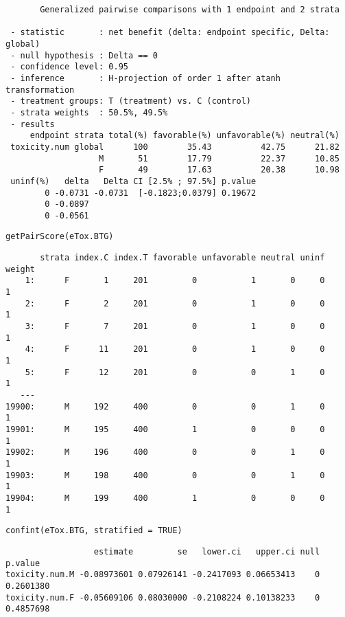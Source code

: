 \documentclass[12pt]{article}
\begin{document}
\begin{verbatim}
       Generalized pairwise comparisons with 1 endpoint and 2 strata

 - statistic       : net benefit (delta: endpoint specific, Delta: global) 
 - null hypothesis : Delta == 0 
 - confidence level: 0.95 
 - inference       : H-projection of order 1 after atanh transformation 
 - treatment groups: T (treatment) vs. C (control) 
 - strata weights  : 50.5%, 49.5% 
 - results
     endpoint strata total(%) favorable(%) unfavorable(%) neutral(%)
 toxicity.num global      100        35.43          42.75      21.82
                   M       51        17.79          22.37      10.85
                   F       49        17.63          20.38      10.98
 uninf(%)   delta   Delta CI [2.5% ; 97.5%] p.value 
        0 -0.0731 -0.0731  [-0.1823;0.0379] 0.19672 
        0 -0.0897                                   
        0 -0.0561
\end{verbatim}

\lstset{language=r,label= ,caption= ,captionpos=b,numbers=none}
\begin{lstlisting}
getPairScore(eTox.BTG)
\end{lstlisting}

\begin{verbatim}
       strata index.C index.T favorable unfavorable neutral uninf weight
    1:      F       1     201         0           1       0     0      1
    2:      F       2     201         0           1       0     0      1
    3:      F       7     201         0           1       0     0      1
    4:      F      11     201         0           1       0     0      1
    5:      F      12     201         0           0       1     0      1
   ---                                                                  
19900:      M     192     400         0           0       1     0      1
19901:      M     195     400         1           0       0     0      1
19902:      M     196     400         0           0       1     0      1
19903:      M     198     400         0           0       1     0      1
19904:      M     199     400         1           0       0     0      1
\end{verbatim}


\lstset{language=r,label= ,caption= ,captionpos=b,numbers=none}
\begin{lstlisting}
confint(eTox.BTG, stratified = TRUE)
\end{lstlisting}

\begin{verbatim}
                  estimate         se   lower.ci   upper.ci null   p.value
toxicity.num.M -0.08973601 0.07926141 -0.2417093 0.06653413    0 0.2601380
toxicity.num.F -0.05609106 0.08030000 -0.2108224 0.10138233    0 0.4857698
\end{verbatim}
\end{document}
